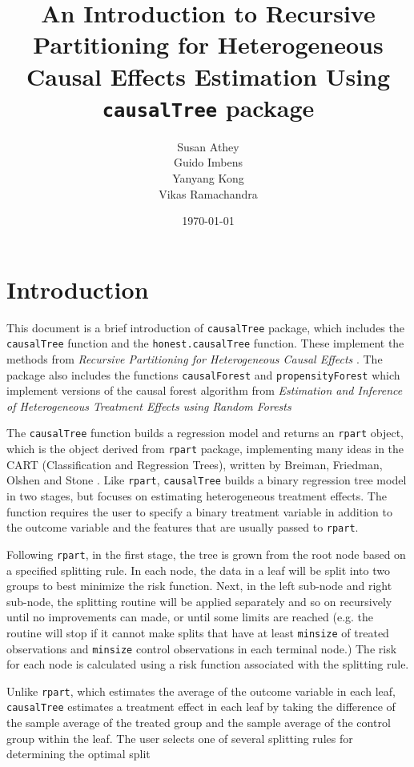 \documentclass[11pt]{article}
\title {An Introduction to Recursive Partitioning for Heterogeneous Causal Effects Estimation Using \texttt{causalTree} package}
\author{Susan Athey \\
        Guido Imbens\\
        Yanyang Kong\\
        Vikas Ramachandra}
\date{\today}
\begin{document}

\maketitle
\tableofcontents

\section{Introduction}
This document is a brief introduction of \texttt{causalTree} package, which includes the \texttt{causalTree} function and the \texttt{honest.causalTree} function.  These implement the methods from \textit{Recursive Partitioning for Heterogeneous Causal Effects} \cite{athey2015machine}. The package also includes the functions \texttt{causalForest} and \texttt{propensityForest} which implement versions of the causal forest algorithm from \textit{Estimation and Inference of Heterogeneous Treatment Effects using Random Forests} \cite{wager2015forest} \par
The \texttt{causalTree} function builds a regression model and returns an \texttt{rpart} object, which is the object derived from \texttt{rpart} package, implementing many ideas in the CART (Classification and Regression Trees), written by Breiman, Friedman, Olshen and Stone \cite{Breiman83}. Like \texttt{rpart}, \texttt{causalTree} builds a binary regression tree model in two stages, but focuses on estimating heterogeneous treatment effects.  The function requires the user to specify a binary treatment variable in addition to the outcome variable and the
features that are usually passed to \texttt{rpart}.\par
Following \texttt{rpart}, in the first stage, the tree is grown from the root node based on a specified splitting rule. In each node, the data in a leaf will be split into two groups to best minimize the risk function. Next, in the left sub-node and right sub-node, the splitting routine will be applied separately and so on recursively until no improvements can made, or until some limits are reached (e.g. the routine will stop if it cannot make splits that have at least \texttt{minsize} of treated observations and \texttt{minsize} control observations in each terminal node.)
The risk for each node is calculated using a risk function associated with the splitting rule. \par
Unlike \texttt{rpart}, which estimates the average of the outcome variable in each leaf, \texttt{causalTree} estimates a treatment effect in each leaf by taking the difference
of the sample average of the treated group and the sample average of the control group within the leaf. The user selects one of several splitting rules for determining the optimal split
\end{document}
